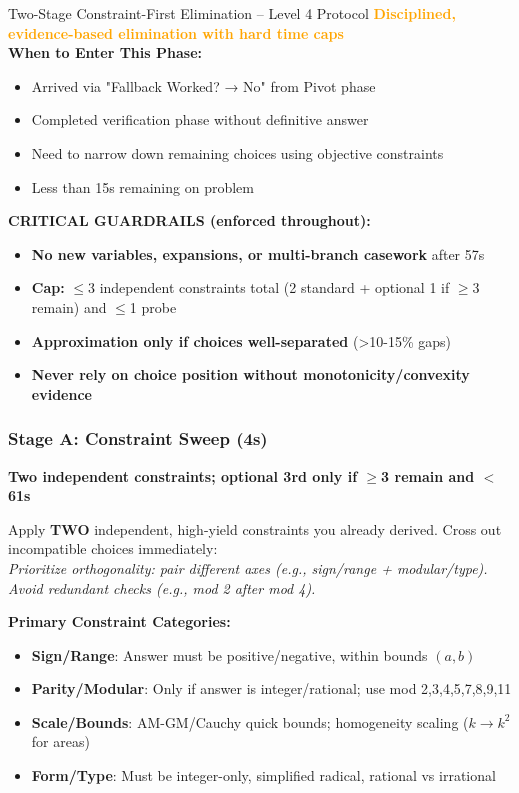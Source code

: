 \documentclass{article}
\begin{document}
\begin{classifybox}{Two-Stage Constraint-First Elimination -- Level 4 Protocol}
{\footnotesize\textcolor{timegreen}{}}\quad\textbf{\textcolor{orange}{Disciplined, evidence-based elimination with hard time caps}}\\
\textbf{When to Enter This Phase:}
\begin{itemize}[nosep]
\item Arrived via "Fallback Worked? → No" from Pivot phase
\item Completed verification phase without definitive answer
\item Need to narrow down remaining choices using objective constraints
\item Less than 15s remaining on problem
\end{itemize}

\textbf{CRITICAL GUARDRAILS (enforced throughout):}
\begin{itemize}[nosep]
\item \textbf{No new variables, expansions, or multi-branch casework} after 57s
\item \textbf{Cap:} $\leq$3 independent constraints total (2 standard + optional 1 if $\geq$3 remain) and $\leq$1 probe
\item \textbf{Approximation only if choices well-separated} (>10-15\% gaps)
\item \textbf{Never rely on choice position without monotonicity/convexity evidence}
\end{itemize}

\subsubsection{Stage A: Constraint Sweep (4s)}
{\footnotesize\textcolor{timegreen}{}}\quad\textbf{Two independent constraints; optional 3rd only if $\geq$3 remain and $<\,$61s}

Apply \textbf{TWO} independent, high-yield constraints you already derived. Cross out incompatible choices immediately:
\\[2pt]\emph{Prioritize orthogonality: pair different axes (e.g., sign/range + modular/type). Avoid redundant checks (e.g., mod 2 after mod 4).}

\textbf{Primary Constraint Categories:}
\begin{itemize}[nosep]
\item \textbf{Sign/Range}: Answer must be positive/negative, within bounds $(a,b)$
\item \textbf{Parity/Modular}: Only if answer is integer/rational; use mod 2,3,4,5,7,8,9,11
\item \textbf{Scale/Bounds}: AM-GM/Cauchy quick bounds; homogeneity scaling ($k \to k^2$ for areas)
\item \textbf{Form/Type}: Must be integer-only, simplified radical, rational vs irrational
\end{itemize}


\end{classifybox}
\end{document}
